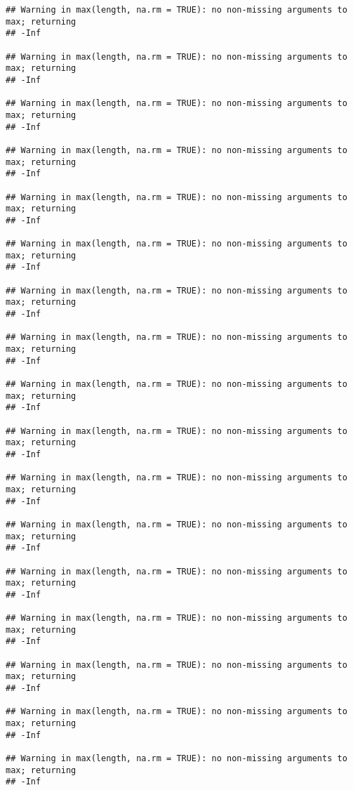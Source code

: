 \documentclass[
]{article}
\begin{document}
\begin{verbatim}
## Warning in max(length, na.rm = TRUE): no non-missing arguments to max; returning
## -Inf

## Warning in max(length, na.rm = TRUE): no non-missing arguments to max; returning
## -Inf

## Warning in max(length, na.rm = TRUE): no non-missing arguments to max; returning
## -Inf

## Warning in max(length, na.rm = TRUE): no non-missing arguments to max; returning
## -Inf

## Warning in max(length, na.rm = TRUE): no non-missing arguments to max; returning
## -Inf

## Warning in max(length, na.rm = TRUE): no non-missing arguments to max; returning
## -Inf

## Warning in max(length, na.rm = TRUE): no non-missing arguments to max; returning
## -Inf

## Warning in max(length, na.rm = TRUE): no non-missing arguments to max; returning
## -Inf

## Warning in max(length, na.rm = TRUE): no non-missing arguments to max; returning
## -Inf

## Warning in max(length, na.rm = TRUE): no non-missing arguments to max; returning
## -Inf

## Warning in max(length, na.rm = TRUE): no non-missing arguments to max; returning
## -Inf

## Warning in max(length, na.rm = TRUE): no non-missing arguments to max; returning
## -Inf

## Warning in max(length, na.rm = TRUE): no non-missing arguments to max; returning
## -Inf

## Warning in max(length, na.rm = TRUE): no non-missing arguments to max; returning
## -Inf

## Warning in max(length, na.rm = TRUE): no non-missing arguments to max; returning
## -Inf

## Warning in max(length, na.rm = TRUE): no non-missing arguments to max; returning
## -Inf

## Warning in max(length, na.rm = TRUE): no non-missing arguments to max; returning
## -Inf
\end{verbatim}
\end{document}
